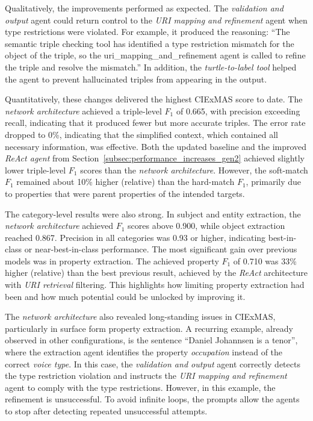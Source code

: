 \documentclass[a4paper,oneside,bibliography=totoc]{scrbook}
\begin{document}
Qualitatively, the improvements performed as expected. The \textit{validation and output} agent could return control to the \textit{\ac{URI} mapping and refinement} agent when type restrictions were violated. For example, it produced the reasoning: \enquote{The semantic triple checking tool has identified a type restriction mismatch for the object of the triple, so the uri\_mapping\_and\_refinement agent is called to refine the triple and resolve the mismatch.} In addition, the \textit{turtle-to-label tool} helped the agent to prevent hallucinated triples from appearing in the output.

Quantitatively, these changes delivered the highest CIExMAS score to date. The \textit{network architecture} achieved a triple-level $F_{1}$ of 0.665, with precision exceeding recall, indicating that it produced fewer but more accurate triples. The error rate dropped to 0\%, indicating that the simplified context, which contained all necessary information, was effective. Both the updated baseline and the improved \textit{\ac{ReAct} agent} from Section~\ref{subsec:performance_increases_gen2} achieved slightly lower triple-level $F_{1}$ scores than the \textit{network architecture}. However, the soft-match $F_{1}$ remained about 10\% higher (relative) than the hard-match $F_{1}$, primarily due to properties that were parent properties of the intended targets.

The category-level results were also strong. In subject and entity extraction, the \textit{network architecture} achieved $F_{1}$ scores above 0.900, while object extraction reached 0.867. Precision in all categories was 0.93 or higher, indicating best-in-class or near-best-in-class performance. The most significant gain over previous models was in property extraction. The achieved property $F_{1}$ of 0.710 was 33\% higher (relative) than the best previous result, achieved by the \textit{\ac{ReAct}} architecture with \textit{\ac{URI} retrieval} filtering. This highlights how limiting property extraction had been and how much potential could be unlocked by improving it.

The \textit{network architecture} also revealed long-standing issues in CIExMAS, particularly in surface form property extraction. A recurring example, already observed in other configurations, is the sentence \enquote{Daniel Johannsen is a tenor}, where the extraction agent identifies the property \textit{occupation} instead of the correct \textit{voice type}. In this case, the \textit{validation and output} agent correctly detects the type restriction violation and instructs the \textit{\ac{URI} mapping and refinement} agent to comply with the type restrictions. However, in this example, the refinement is unsuccessful. To avoid infinite loops, the prompts allow the agents to stop after detecting repeated unsuccessful attempts.
\end{document}
